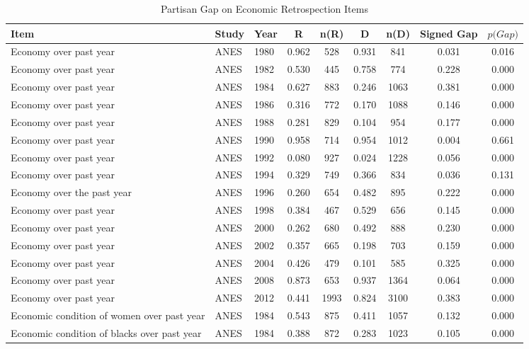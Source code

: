 \begin{table}[!htb]
\centering
\caption{Partisan Gap on Economic Retrospection Items} 
\label{tab:econ}
\begingroup\tiny
\begin{tabular}{lllcccccc}
  \hline
Item & Study & Year & R & n(R) & D & n(D) & Signed Gap & $\textit{p(Gap)}$ \\ 
  \hline
Economy over past year & ANES & 1980 & 0.962 &  528 & 0.931 &  841 & 0.031 & 0.016 \\ 
  Economy over past year & ANES & 1982 & 0.530 &  445 & 0.758 &  774 & 0.228 & 0.000 \\ 
  Economy over past year & ANES & 1984 & 0.627 &  883 & 0.246 & 1063 & 0.381 & 0.000 \\ 
  Economy over past year & ANES & 1986 & 0.316 &  772 & 0.170 & 1088 & 0.146 & 0.000 \\ 
  Economy over past year & ANES & 1988 & 0.281 &  829 & 0.104 &  954 & 0.177 & 0.000 \\ 
  Economy over past year & ANES & 1990 & 0.958 &  714 & 0.954 & 1012 & 0.004 & 0.661 \\ 
  Economy over past year & ANES & 1992 & 0.080 &  927 & 0.024 & 1228 & 0.056 & 0.000 \\ 
  Economy over past year & ANES & 1994 & 0.329 &  749 & 0.366 &  834 & 0.036 & 0.131 \\ 
  Economy over the past year & ANES & 1996 & 0.260 &  654 & 0.482 &  895 & 0.222 & 0.000 \\ 
  Economy over past year & ANES & 1998 & 0.384 &  467 & 0.529 &  656 & 0.145 & 0.000 \\ 
  Economy over past year & ANES & 2000 & 0.262 &  680 & 0.492 &  888 & 0.230 & 0.000 \\ 
  Economy over past year & ANES & 2002 & 0.357 &  665 & 0.198 &  703 & 0.159 & 0.000 \\ 
  Economy over past year & ANES & 2004 & 0.426 &  479 & 0.101 &  585 & 0.325 & 0.000 \\ 
  Economy over past year & ANES & 2008 & 0.873 &  653 & 0.937 & 1364 & 0.064 & 0.000 \\ 
  Economy over past year & ANES & 2012 & 0.441 & 1993 & 0.824 & 3100 & 0.383 & 0.000 \\ 
  Economic condition of women over past year & ANES & 1984 & 0.543 &  875 & 0.411 & 1057 & 0.132 & 0.000 \\ 
  Economic condition of blacks over past year & ANES & 1984 & 0.388 &  872 & 0.283 & 1023 & 0.105 & 0.000 \\ 

\end{tabular}
\end{table}
